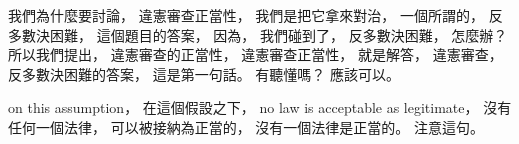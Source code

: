 \hypertarget{w02:cue:400}{}我們為什麼要討論，
\hypertarget{w02:cue:401}{}違憲審查正當性，
\hypertarget{w02:cue:402}{}我們是把它拿來對治，
\hypertarget{w02:cue:403}{}一個所謂的，
\hypertarget{w02:cue:404}{}反多數決困難，
\hypertarget{w02:cue:405}{}這個題目的答案，
\hypertarget{w02:cue:406}{}因為，
\hypertarget{w02:cue:407}{}我們碰到了，
\hypertarget{w02:cue:408}{}反多數決困難，
\hypertarget{w02:cue:409}{}怎麼辦？
\hypertarget{w02:cue:410}{}所以我們提出，
\hypertarget{w02:cue:411}{}違憲審查的正當性，
\hypertarget{w02:cue:412}{}違憲審查正當性，
\hypertarget{w02:cue:413}{}就是解答，
\hypertarget{w02:cue:414}{}違憲審查，
\hypertarget{w02:cue:415}{}反多數決困難的答案，
\hypertarget{w02:cue:416}{}這是第一句話。
\hypertarget{w02:cue:417}{}有聽懂嗎？
\hypertarget{w02:cue:418}{}應該可以。

\hypertarget{w02:cue:419}{}on this assumption，
\hypertarget{w02:cue:420}{}在這個假設之下，
\hypertarget{w02:cue:421}{}no law is acceptable as legitimate，
\hypertarget{w02:cue:422}{}沒有任何一個法律，
\hypertarget{w02:cue:423}{}可以被接納為正當的，
\hypertarget{w02:cue:424}{}沒有一個法律是正當的。
\hypertarget{w02:cue:425}{}注意這句。

